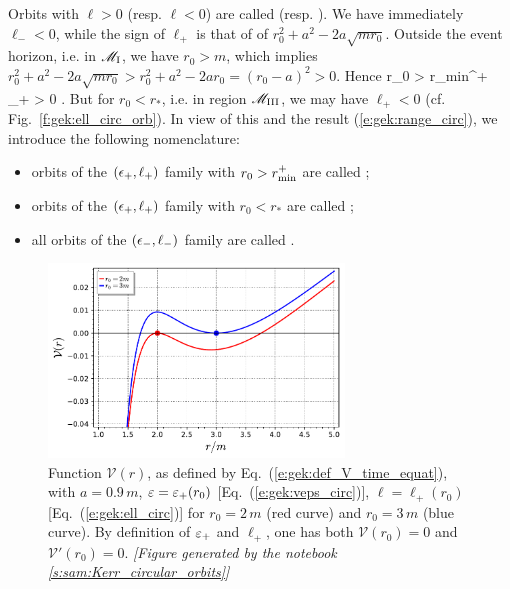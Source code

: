 Orbits with $\ell > 0$ (resp. $\ell < 0$) are called 
(resp. ).
We have immediately $\ell_- < 0$, while the sign of $\ell_+$ is that of
of $r_0^2 + a^2 - 2 a \sqrt{mr_0}$.
Outside the event horizon, i.e. in $\mathscr{M}_{\rm I}$, we have $r_0 > m$, which
implies $r_0^2 + a^2 - 2 a \sqrt{mr_0} > r_0^2 + a^2 - 2 a r_0 = (r_0 - a)^2 > 0$. Hence
\be
    r_0 > r_{\rm min}^+ \quad\Longrightarrow\quad \ell_+ > 0 .
\ee
But for $r_0 < r_*$, i.e. in region $\mathscr{M}_{\rm III}$, we may have $\ell_+ < 0$
(cf. Fig.~\ref{f:gek:ell_circ_orb}).
In view of this and the result (\ref{e:gek:range_circ}), we introduce the following nomenclature:
\begin{itemize}
\item orbits of the $(\epsilon_+,\ell_+)$ family with $r_0 >  r_{\rm min}^+$
are called ;
\item orbits of the $(\epsilon_+,\ell_+)$ family with $r_0 < r_*$
are called ;
\item all orbits of the $(\epsilon_-,\ell_-)$ family
are called .
\end{itemize}

\begin{figure}
\centerline{\includegraphics[width=0.7\textwidth]{gek_V_stability.pdf}}
\caption[]{\label{f:gek:V_stability} \footnotesize
Function $\mathcal{V}(r)$, as defined by Eq.~(\ref{e:gek:def_V_time_equat}),
with $a=0.9\, m$, $\varepsilon = \varepsilon_+(r_0)$ [Eq.~(\ref{e:gek:veps_circ})],
$\ell = \ell_+(r_0)$ [Eq.~(\ref{e:gek:ell_circ})] for $r_0 = 2\, m$
(red curve) and $r_0 = 3 \, m$ (blue curve). By definition of $\varepsilon_+$ and $\ell_+$,
one has both $\mathcal{V}(r_0) = 0$ and $\mathcal{V}'(r_0) = 0$.
\textsl{[Figure generated by the notebook \ref{s:sam:Kerr_circular_orbits}]}
}
\end{figure}

